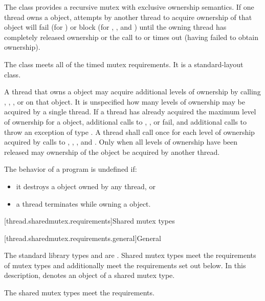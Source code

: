\pnum
{}%
The class  provides a recursive mutex with exclusive
ownership semantics. If one thread owns a  object,
attempts by another thread to acquire ownership of that object will fail (for
) or block (for , , and
) until the owning thread has completely released
ownership or the call to  or 
times out (having failed to obtain ownership).

\pnum
The class  meets
all of the timed mutex requirements.
It is a standard-layout class.

\pnum
A thread that owns a  object may acquire additional
levels of ownership by calling , ,
, or  on that object. It is
unspecified how many levels of ownership may be acquired by a single thread. If
a thread has already acquired the maximum level of ownership for a
 object, additional calls to ,
, or  fail, and additional
calls to  throw an exception of type . A
thread shall call  once for each level of ownership acquired by
calls to , , , and
. Only when all levels of ownership have been released
may ownership of the object be acquired by another thread.

\pnum
The behavior of a program is undefined if:
\begin{itemize}
\item it destroys a  object owned by any thread, or
\item a thread terminates while owning a  object.
\end{itemize}


[thread.sharedmutex.requirements]{Shared mutex types}

[thread.sharedmutex.requirements.general]{General}

\pnum
The standard library types  and 
are . Shared mutex types meet the requirements of
mutex types and additionally
meet the requirements set out below. In this description,
 denotes an object of a shared mutex type.
\begin{note}
The shared mutex types meet the 
requirements.
\end{note}

